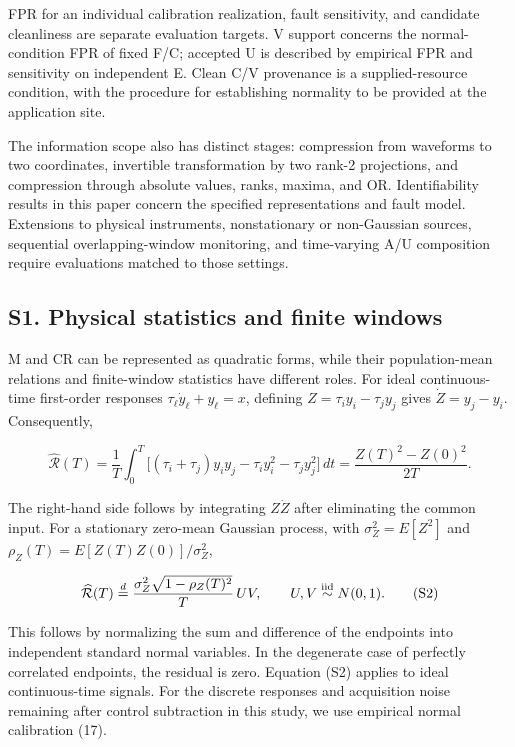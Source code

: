 \documentclass[10pt,a4paper]{article}
\begin{document}
FPR for an individual calibration realization, fault sensitivity, and candidate cleanliness are separate evaluation targets. V support concerns the normal-condition FPR of fixed F/C; accepted U is described by empirical FPR and sensitivity on independent E. Clean C/V provenance is a supplied-resource condition, with the procedure for establishing normality to be provided at the application site.

The information scope also has distinct stages: compression from waveforms to two coordinates, invertible transformation by two rank-2 projections, and compression through absolute values, ranks, maxima, and OR. Identifiability results in this paper concern the specified representations and fault model. Extensions to physical instruments, nonstationary or non-Gaussian sources, sequential overlapping-window monitoring, and time-varying A/U composition require evaluations matched to those settings.

\subsection{S1. Physical statistics and finite windows}

M and CR can be represented as quadratic forms, while their population-mean relations and finite-window statistics have different roles. For ideal continuous-time first-order responses \(\tau_\ell\dot y_\ell+y_\ell=x\), defining \(Z=\tau_i y_i-\tau_j y_j\) gives \(\dot Z=y_j-y_i\). Consequently,

\begin{equation}
\widehat{\mathcal R}(T)
=\frac1T\int_0^T\bigl[(\tau_i+\tau_j)y_iy_j-\tau_i y_i^2-\tau_jy_j^2\bigr]\,dt
=\frac{Z(T)^2-Z(0)^2}{2T}.
\tag{S1}
\end{equation}

The right-hand side follows by integrating \(Z\dot Z\) after eliminating the common input. For a stationary zero-mean Gaussian process, with \(\sigma_Z^2=E[Z^2]\) and \(\rho_Z(T)=E[Z(T)Z(0)]/\sigma_Z^2\),

\begin{equation}
\widehat{\mathcal R}(T)\overset d=
\frac{\sigma_Z^2\sqrt{1-\rho_Z(T)^2}}{T}\,UV,\qquad
U,V\stackrel{\rm iid}{\sim}N(0,1).
\tag{S2}
\end{equation}

This follows by normalizing the sum and difference of the endpoints into independent standard normal variables. In the degenerate case of perfectly correlated endpoints, the residual is zero. Equation (S2) applies to ideal continuous-time signals. For the discrete responses and acquisition noise remaining after control subtraction in this study, we use empirical normal calibration (17).
\end{document}

